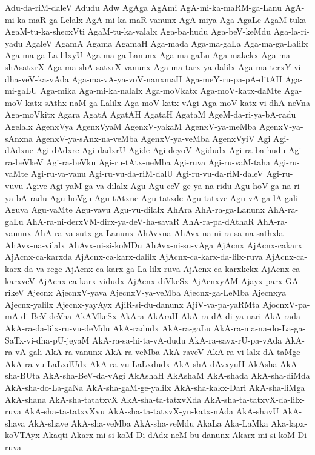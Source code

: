 {Adu-da-riM-daleV
Adudu
Adw
AgAga
AgAmi
AgA-mi-ka-maRM-ga-Lanu
AgA-mi-ka-maR-ga-Lelalx
AgA-mi-ka-maR-vanunx
AgA-miya
Aga
AgaLe
AgaM-tuka
AgaM-tu-ka-shecxVti
AgaM-tu-ka-valalx
Aga-ba-hudu
Aga-beV-keMdu
Aga-la-ri-yadu
AgaleV
AgamA
Agama
AgamaH
Aga-mada
Aga-ma-gaLa
Aga-ma-ga-Lalilx
Aga-ma-ga-La-lilxyU
Aga-ma-ga-Lanunx
Aga-ma-gaLu
Aga-makekx
Aga-ma-shAsatxrX
Aga-ma-shA-satxrX-vanunx
Aga-ma-tarx-ya-dalilx
Aga-ma-terxY-vi-dha-veV-ka-vAda
Aga-ma-vA-ya-voV-nanxmaH
Aga-meY-ru-pa-pA-ditAH
Aga-mi-gaLU
Aga-mika
Aga-mi-ka-nalalx
Aga-moVkatx
Aga-moV-katx-daMte
Aga-moV-katx-sAthx-naM-ga-Lalilx
Aga-moV-katx-vAgi
Aga-moV-katx-vi-dhA-neVna
Aga-moVkitx
Agara
AgatA
AgatAH
AgataH
AgataM
AgeM-da-ri-ya-bA-radu
Agelalx
AgenxVya
AgenxVyaM
AgenxV-yakaM
AgenxV-ya-meMba
AgenxV-ya-sAnxna
AgenxV-ya-sAnx-na-veMba
AgenxV-ya-veMba
AgenxVyiV
Agi
Agi-dAdxne
Agi-dAdxre
Agi-dadxrU
Agide
Agi-deyoV
Agidudx
Agi-ra-ba-hudu
Agi-ra-beVkeV
Agi-ra-beVku
Agi-ru-tAtx-neMba
Agi-ruva
Agi-ru-vaM-taha
Agi-ru-vaMte
Agi-ru-va-vanu
Agi-ru-vu-da-riM-dalU
Agi-ru-vu-da-riM-daleV
Agi-ru-vuvu
Agive
Agi-yaM-ga-va-dilalx
Agu
Agu-ceV-ge-ya-na-ridu
Agu-hoV-ga-na-ri-ya-bA-radu
Agu-hoVgu
Agu-tAtxne
Agu-tatxde
Agu-tatxve
Agu-vA-ga-lA-gali
Aguva
Agu-vaMte
Agu-vavu
Agu-vu-dilalx
AhAra
AhA-ra-ga-Lanunx
AhA-ra-gaLu
AhA-ra-ni-derxVM-dirx-ya-deV-ha-savaR
AhA-ra-pa-dAthaR
AhA-ra-vanunx
AhA-ra-va-sutx-ga-Lanunx
AhAvxna
AhAvx-na-ni-ra-sa-na-sathxla
AhAvx-na-vilalx
AhAvx-ni-si-koMDu
AhAvx-ni-su-vAga
AjAcnx
AjAcnx-cakarx
AjAcnx-ca-karxda
AjAcnx-ca-karx-dalilx
AjAcnx-ca-karx-da-lilx-ruva
AjAcnx-ca-karx-da-va-rege
AjAcnx-ca-karx-ga-La-lilx-ruva
AjAcnx-ca-karxkekx
AjAcnx-ca-karxveV
AjAcnx-ca-karx-vidudx
AjAcnx-diVkeSx
AjAcnxyAM
Ajayx-parx-GA-rikeV
Ajecnx
AjecnxV-yava
AjecnxV-ya-veMba
Ajecnx-ga-LeMba
Ajecnxya
Ajecnx-yalilx
Ajecnx-yayAyx
AjiR-si-du-danunx
AjiV-va-pa-yaRMta
AjocnxV-pa-mA-di-BeV-deVna
AkAMkeSx
AkAra
AkAraH
AkA-ra-dA-di-ya-nari
AkA-rada
AkA-ra-da-lilx-ru-vu-deMdu
AkA-radudx
AkA-ra-gaLu
AkA-ra-ma-na-do-La-ga-SaTx-vi-dha-pU-jeyaM
AkA-ra-sa-hi-ta-vA-dudu
AkA-ra-savx-rU-pa-vAda
AkA-ra-vA-gali
AkA-ra-vanunx
AkA-ra-veMba
AkA-raveV
AkA-ra-vi-lalx-dA-taMge
AkA-ra-vu-LaLxdUdx
AkA-ra-vu-LaLxdudx
AkA-shA-dAvxyuH
AkAsha
AkA-sha-BUta
AkA-sha-BeV-da-vAgi
AkAshaH
AkAshaM
AkA-shada
AkA-sha-diMda
AkA-sha-do-La-gaNa
AkA-sha-gaM-ge-yalilx
AkA-sha-kakx-Dari
AkA-sha-liMga
AkA-shana
AkA-sha-tatatxvX
AkA-sha-ta-tatxvXda
AkA-sha-ta-tatxvX-da-lilx-ruva
AkA-sha-ta-tatxvXvu
AkA-sha-ta-tatxvX-yu-katx-nAda
AkA-shavU
AkA-shava
AkA-shave
AkA-sha-veMba
AkA-sha-veMdu
AkaLa
Aka-LaMka
Aka-lapx-koVTAyx
Akaqti
Akarx-mi-si-koM-Di-dAdx-neM-bu-danunx
Akarx-mi-si-koM-Di-ruva
}
